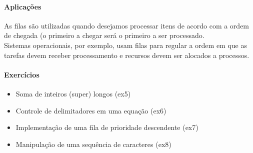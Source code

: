 
\begin{frame}
	\framesubtitle{\subsecname\- Aplicações}
	
	As filas são utilizadas quando desejamos processar itens de acordo com a 
	ordem de chegada (o primeiro a chegar será o primeiro a ser processado.
	\\\vfill\pause
	Sistemas operacionais, por exemplo, usam filas para regular a ordem em que 
	as tarefas devem receber processamento e recursos devem ser alocados a processos.
\end{frame}

\begin{frame}
	\framesubtitle{Exercícios}
	
	\begin{itemize}
		\setlength{\itemsep}{\baselineskip}
		\item Soma de inteiros (super) longos (ex5)
		\item Controle de delimitadores em uma equação (ex6)
		\item Implementação de uma fila de prioridade descendente (ex7)
		\item Manipulação de uma sequência de caracteres (ex8)
	\end{itemize}
\end{frame}